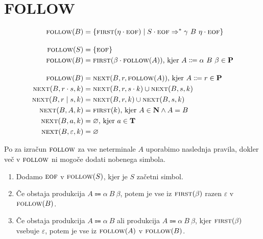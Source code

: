 \documentclass{report}
\newcommand{\Empty}{\varnothing}
\newcommand{\Null}{\varepsilon}
\newcommand{\Seq}{\cdot}
\newcommand{\Spc}{\ }
\newcommand{\Union}{\mathrel{|}}
\newcommand{\Set}[1]{\mathbf{#1}}
\newcommand{\FIRST}{\textsc{first}}
\newcommand{\FOLLOW}{\textsc{follow}}
\newcommand{\NEXT}{\textsc{next}}
\newcommand{\EOF}{\textsc{eof}}
\newcommand{\Terminals}{\Set{T}}
\newcommand{\Productions}{\Set{P}}
\newcommand{\NonTerminals}{\Set{N}}
\newcommand{\Arrow}{\Coloneq}
\newcommand{\DeriveStar}{\Rightarrow^\ast}
\newcommand{\NT}[1]{{#1}}
\newcommand{\T}[1]{{#1}}
\begin{document}
\section{FOLLOW}
\begin{tcolorbox}[title={Definicija}]
  \begin{equation*}
    \begin{aligned}
      \FOLLOW(\NT{B}) &= \{ \FIRST(\eta \Seq \EOF) \mid \NT{S} \Seq \EOF \DeriveStar \gamma \Spc \NT{B} \Spc \eta \Seq \EOF \}\\[1em]
      \FOLLOW(\NT{S}) &= \{\EOF\}\\
      \FOLLOW(\NT{B}) &= \FIRST(\beta \Seq \FOLLOW(\NT{A}))\text{, kjer } \NT{A} \Arrow \alpha \Spc \NT{B} \Spc \beta \in \Productions\\[1em]
      \FOLLOW(\NT{B}) &= \NEXT(\NT{B}, r, \FOLLOW(\NT{A}))\text{, kjer } \NT{A} \Arrow r \in \Productions\\
      \NEXT(\NT{B}, r \Seq s, k) &= \NEXT(\NT{B}, r, s \Seq k) \cup \NEXT(\NT{B}, s, k)\\
      \NEXT(\NT{B}, r \Union s, k) &= \NEXT(\NT{B}, r, k) \cup \NEXT(\NT{B}, s, k)\\
      \NEXT(\NT{B}, \NT{A}, k) &= \FIRST(k) \text{, kjer } \NT{A} \in \NonTerminals \land \NT{A} = \NT{B} \\
      \NEXT(\NT{B}, \T{a}, k) &= \Empty\text{, kjer } \T{a} \in \Terminals\\
      \NEXT(\NT{B}, \Null, k) &= \Empty
    \end{aligned}
  \end{equation*}
\end{tcolorbox}

Po \cite{dragonbook} za izračun $\FOLLOW$ za vse neterminale $\NT{A}$ uporabimo naslednja pravila, dokler več v $\FOLLOW$ ni mogoče dodati nobenega simbola.
\begin{enumerate}
  \item Dodamo $\EOF$ v $\FOLLOW(\NT{S})$, kjer je $\NT{S}$ začetni simbol.
  \item Če obstaja produkcija $\NT{A} \Arrow \alpha \Spc \NT{B} \Spc \beta$, potem je vse iz $\FIRST(\beta)$ razen $\Null$ v $\FOLLOW(\NT{B})$.
  \item Če obstaja produkcija $\NT{A} \Arrow \alpha \Spc \NT{B}$ ali produkcija $\NT{A} \Arrow \alpha \Spc \NT{B} \Spc \beta$, kjer $\FIRST(\beta)$ vsebuje $\Null$, potem je vse iz $\FOLLOW(\NT{A})$ v $\FOLLOW(\NT{B})$.
\end{enumerate}
\end{document}
